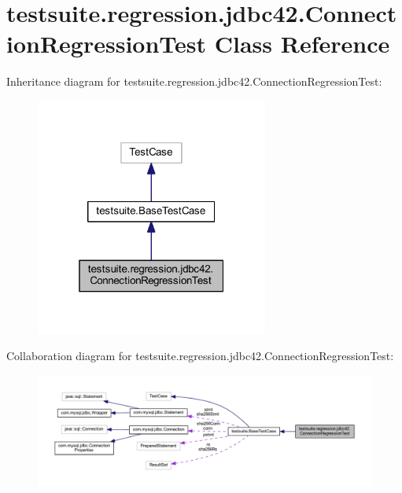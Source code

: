 \hypertarget{classtestsuite_1_1regression_1_1jdbc42_1_1_connection_regression_test}{}\section{testsuite.\+regression.\+jdbc42.\+Connection\+Regression\+Test Class Reference}
\label{classtestsuite_1_1regression_1_1jdbc42_1_1_connection_regression_test}


Inheritance diagram for testsuite.\+regression.\+jdbc42.\+Connection\+Regression\+Test\+:
\nopagebreak
\begin{figure}[H]
\begin{center}
\leavevmode
\includegraphics[width=217pt]{classtestsuite_1_1regression_1_1jdbc42_1_1_connection_regression_test__inherit__graph}
\end{center}
\end{figure}


Collaboration diagram for testsuite.\+regression.\+jdbc42.\+Connection\+Regression\+Test\+:
\nopagebreak
\begin{figure}[H]
\begin{center}
\leavevmode
\includegraphics[width=350pt]{classtestsuite_1_1regression_1_1jdbc42_1_1_connection_regression_test__coll__graph}
\end{center}
\end{figure}
